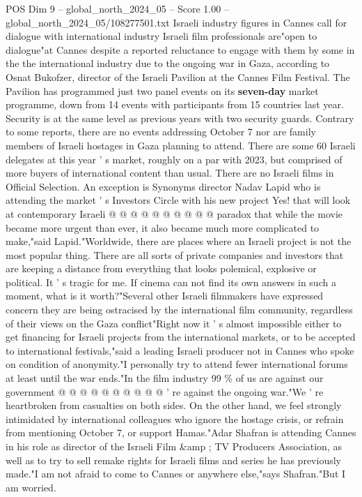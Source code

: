 \begin{textsample}{POS Dim 9 – global\_north\_2024\_05 – Score 1.00 – global\_north\_2024\_05/108277501.txt}  \label{ex:f9_pos_293}
Israeli industry figures in Cannes call for dialogue with international industry Israeli film professionals are"open to dialogue"at Cannes despite a reported reluctance to engage with them by some in the the international industry due to the ongoing war in Gaza, according to Osnat Bukofzer, director of the Israeli Pavilion at the Cannes Film Festival.
The Pavilion has programmed just two panel events on its \textbf{seven-day} market programme, down from 14 events with participants from 15 countries last year.
Security is at the same level as previous years with two security guards.
Contrary to some reports, there are no events addressing October 7 nor are family members of Israeli hostages in Gaza planning to attend.
There are some 60 Israeli delegates at this year ' s market, roughly on a par with 2023, but comprised of more buyers of international content than usual.
There are no Israeli films in Official Selection.
An exception is Synonyms director Nadav Lapid who is attending the market ' s Investors Circle with his new project Yes! that will look at contemporary Israeli @ @ @ @ @ @ @ @ @ @ paradox that while the movie became more urgent than ever, it also became much more complicated to make,"said Lapid."Worldwide, there are places where an Israeli project is not the most popular thing.
There are all sorts of private companies and investors that are keeping a distance from everything that looks polemical, explosive or political.
It ' s tragic for me.
If cinema can not find its own answers in such a moment, what is it worth?"Several other Israeli filmmakers have expressed concern they are being ostracised by the international film community, regardless of their views on the Gaza conflict"Right now it ' s almost impossible either to get financing for Israeli projects from the international markets, or to be accepted to international festivals,"said a leading Israeli producer not in Cannes who spoke on condition of anonymity."I personally try to attend fewer international forums at least until the war ends."In the film industry 99 \% of us are against our government @ @ @ @ @ @ @ @ @ @ ' re against the ongoing war."We ' re heartbroken from casualties on both sides.
On the other hand, we feel strongly intimidated by international colleagues who ignore the hostage crisis, or refrain from mentioning October 7, or support Hamas."Adar Shafran is attending Cannes in his role as director of the Israeli Film \&amp ; TV Producers Association, as well as to try to sell remake rights for Israeli films and series he has previously made."I am not afraid to come to Cannes or anywhere else,"says Shafran."But I am worried.

\end{textsample}
